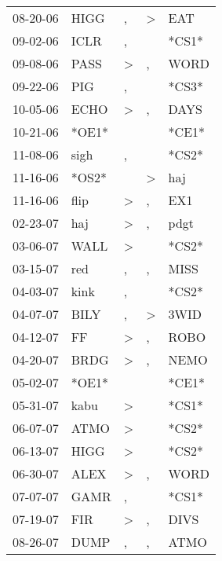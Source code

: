 \begin{supertabular}{lllll}
 08-20-06 &   HIGG &                , &     \textgreater &    EAT \\
 09-02-06 &   ICLR &                , &                  &  *CS1* \\
 09-08-06 &   PASS &     \textgreater &                , &   WORD \\
 09-22-06 &    PIG &                , &                  &  *CS3* \\
 10-05-06 &   ECHO &     \textgreater &                , &   DAYS \\
 10-21-06 &  *OE1* &                  &                  &  *CE1* \\
 11-08-06 &   sigh &                , &                  &  *CS2* \\
 11-16-06 &  *OS2* &                  &     \textgreater &    haj \\
 11-16-06 &   flip &     \textgreater &                , &    EX1 \\
 02-23-07 &    haj &     \textgreater &                , &   pdgt \\
 03-06-07 &   WALL &     \textgreater &                  &  *CS2* \\
 03-15-07 &    red &                , &                , &   MISS \\
 04-03-07 &   kink &                , &                  &  *CS2* \\
 04-07-07 &   BILY &                , &     \textgreater &   3WID \\
 04-12-07 &     FF &     \textgreater &                , &   ROBO \\
 04-20-07 &   BRDG &     \textgreater &                , &   NEMO \\
 05-02-07 &  *OE1* &                  &                  &  *CE1* \\
 05-31-07 &   kabu &     \textgreater &                  &  *CS1* \\
 06-07-07 &   ATMO &     \textgreater &                  &  *CS2* \\
 06-13-07 &   HIGG &     \textgreater &                  &  *CS2* \\
 06-30-07 &   ALEX &     \textgreater &                , &   WORD \\
 07-07-07 &   GAMR &                , &                  &  *CS1* \\
 07-19-07 &    FIR &     \textgreater &                , &   DIVS \\
 08-26-07 &   DUMP &                , &                , &   ATMO \\

\end{supertabular}
